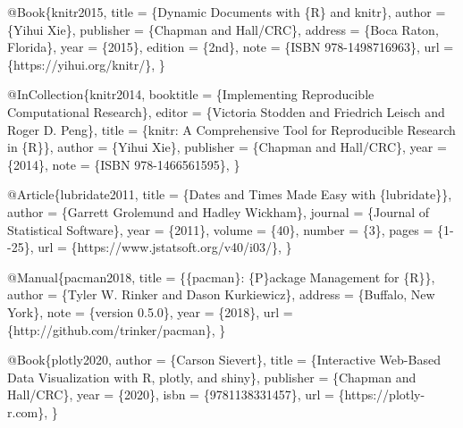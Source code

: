 \documentclass[
]{article}
\newenvironment{Shaded}{\begin{snugshade}}{\end{snugshade}}
\newcommand{\DataTypeTok}[1]{\textcolor[rgb]{0.13,0.29,0.53}{#1}}
\newcommand{\NormalTok}[1]{#1}
\newcommand{\OtherTok}[1]{\textcolor[rgb]{0.56,0.35,0.01}{#1}}
\newcommand{\VariableTok}[1]{\textcolor[rgb]{0.00,0.00,0.00}{#1}}
\begin{document}
\begin{Shaded}
\begin{Highlighting}[]
\VariableTok{@Book}\NormalTok{\{}\OtherTok{knitr2015}\NormalTok{,}
  \DataTypeTok{title}\NormalTok{ = \{Dynamic Documents with \{R\} and knitr\},}
  \DataTypeTok{author}\NormalTok{ = \{Yihui Xie\},}
  \DataTypeTok{publisher}\NormalTok{ = \{Chapman and Hall/CRC\},}
  \DataTypeTok{address}\NormalTok{ = \{Boca Raton, Florida\},}
  \DataTypeTok{year}\NormalTok{ = \{2015\},}
  \DataTypeTok{edition}\NormalTok{ = \{2nd\},}
  \DataTypeTok{note}\NormalTok{ = \{ISBN 978{-}1498716963\},}
  \DataTypeTok{url}\NormalTok{ = \{https://yihui.org/knitr/\},}
\NormalTok{\}}

\VariableTok{@InCollection}\NormalTok{\{}\OtherTok{knitr2014}\NormalTok{,}
  \DataTypeTok{booktitle}\NormalTok{ = \{Implementing Reproducible Computational Research\},}
  \DataTypeTok{editor}\NormalTok{ = \{Victoria Stodden and Friedrich Leisch and Roger D. Peng\},}
  \DataTypeTok{title}\NormalTok{ = \{knitr: A Comprehensive Tool for Reproducible Research in \{R\}\},}
  \DataTypeTok{author}\NormalTok{ = \{Yihui Xie\},}
  \DataTypeTok{publisher}\NormalTok{ = \{Chapman and Hall/CRC\},}
  \DataTypeTok{year}\NormalTok{ = \{2014\},}
  \DataTypeTok{note}\NormalTok{ = \{ISBN 978{-}1466561595\},}
\NormalTok{\}}

\VariableTok{@Article}\NormalTok{\{}\OtherTok{lubridate2011}\NormalTok{,}
  \DataTypeTok{title}\NormalTok{ = \{Dates and Times Made Easy with \{lubridate\}\},}
  \DataTypeTok{author}\NormalTok{ = \{Garrett Grolemund and Hadley Wickham\},}
  \DataTypeTok{journal}\NormalTok{ = \{Journal of Statistical Software\},}
  \DataTypeTok{year}\NormalTok{ = \{2011\},}
  \DataTypeTok{volume}\NormalTok{ = \{40\},}
  \DataTypeTok{number}\NormalTok{ = \{3\},}
  \DataTypeTok{pages}\NormalTok{ = \{1{-}{-}25\},}
  \DataTypeTok{url}\NormalTok{ = \{https://www.jstatsoft.org/v40/i03/\},}
\NormalTok{\}}

\VariableTok{@Manual}\NormalTok{\{}\OtherTok{pacman2018}\NormalTok{,}
  \DataTypeTok{title}\NormalTok{ = \{\{pacman\}: \{P\}ackage Management for \{R\}\},}
  \DataTypeTok{author}\NormalTok{ = \{Tyler W. Rinker and Dason Kurkiewicz\},}
  \DataTypeTok{address}\NormalTok{ = \{Buffalo, New York\},}
  \DataTypeTok{note}\NormalTok{ = \{version 0.5.0\},}
  \DataTypeTok{year}\NormalTok{ = \{2018\},}
  \DataTypeTok{url}\NormalTok{ = \{http://github.com/trinker/pacman\},}
\NormalTok{\}}

\VariableTok{@Book}\NormalTok{\{}\OtherTok{plotly2020}\NormalTok{,}
  \DataTypeTok{author}\NormalTok{ = \{Carson Sievert\},}
  \DataTypeTok{title}\NormalTok{ = \{Interactive Web{-}Based Data Visualization with R, plotly, and shiny\},}
  \DataTypeTok{publisher}\NormalTok{ = \{Chapman and Hall/CRC\},}
  \DataTypeTok{year}\NormalTok{ = \{2020\},}
  \DataTypeTok{isbn}\NormalTok{ = \{9781138331457\},}
  \DataTypeTok{url}\NormalTok{ = \{https://plotly{-}r.com\},}
\NormalTok{\}}


\end{Highlighting}
\end{Shaded}
\end{document}
